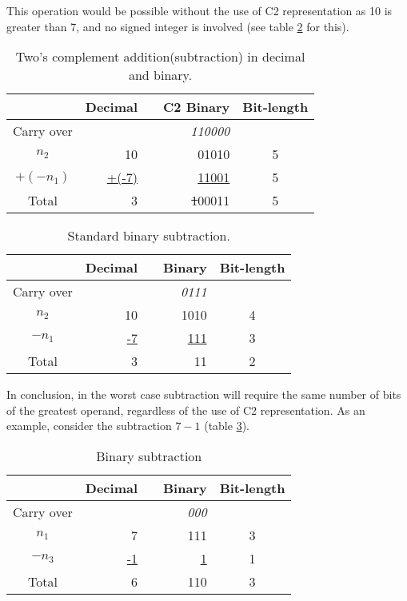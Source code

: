 \documentclass[12pt]{article}
\begin{document}
This operation would be possible without the use of C2 representation as 10 is
greater than 7, and no signed integer is involved (see table \ref{tab:04} for
this).

\begin{table}[ht]
	\centering
    \caption{Two's complement addition(subtraction) in decimal and binary.}
    \begin{tabular}{crrrc}
    \hline
    	  & Decimal & & C2 Binary & Bit-length \\
    \hline      
    Carry over & 	& & \textit{110000} & \\
    $n_2$ & 10	& & 01010 & 5 \\
    $+(-n_1)$ & \underline{+(-7)} & & \underline{11001} & 5 \\
    Total & 3	& & \sout{1}00011 & 5 \\
    \hline
	\end{tabular}
    \label{tab:03}
\end{table}

\begin{table}[ht]
	\centering
    \caption{Standard binary subtraction.}
    \begin{tabular}{crrrc}
    \hline
    	  & Decimal & & Binary & Bit-length \\
    \hline      
    Carry over& 	& & \textit{0111} & \\
    $n_2$ & 10	& & 1010 & 4 \\
    $-n_1$ & \underline{-7} & & \underline{111} & 3 \\
    Total & 3	& & 11 & 2\\
    \hline
	\end{tabular}
    \label{tab:04}
\end{table}

In conclusion, in the worst case subtraction will require the same number of
bits of the greatest operand, regardless of the use of C2 representation. As an
example, consider the subtraction $7-1$ (table \ref{tab:05}).

\begin{table}[ht]
	\centering
    \caption{Binary subtraction}
    \begin{tabular}{crrrc}
    \hline
    	  & Decimal & & Binary & Bit-length \\
    \hline      
    Carry over & 	& & \textit{000} & \\
    $n_1$ & 7	& & 111 & 3 \\
    $-n_3$ & \underline{-1} & & \underline{1} & 1 \\
    Total & 6	& & 110 & 3\\
    \hline
	\end{tabular}
    \label{tab:05}
\end{table}
\end{document}
